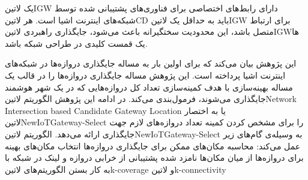 یک ‌لاتین{IGW} دارای رابط‌های اختصاصی برای فناوری‌های پشتیبانی شده توسط شبکه‌های اینترنت اشیا است.
هر ‌لاتین{CD} باید به حداقل یک ‌لاتین{IGW} برای ارتباط متصل باشد، این محدودیت سختگیرانه باعث می‌شود، جایگذاری راهبردی ‌لاتین{IGW}ها یک قمست کلیدی
در طراحی شبکه باشد.

این پژوهش بیان می‌کند که برای اولین بار به مساله جایگذاری دروازه‌ها در شبکه‌های اینترنت اشیا پرداخته است.
این پژوهش مساله جایگذاری دروازه‌ها را در قالب یک مساله بهینه‌سازی با هدف کمینه‌سازی تعداد کل دروازه‌هایی که در یک شهر هوشمند
جایگذاری می‌شوند، فرمول‌بندی می‌کند.
در ادامه این پژوهش الگوریتم ‌لاتین{Network Intersection based Candidate Gateway Location}
یا به اختصار ‌لاتین{NewIoTGateway-Select} را برای مشخص کردن کمینه تعداد دروازه‌های لازم جهت جایگذاری ارائه می‌دهد.
الگوریتم ‌لاتین{NewIoTGateway-Select} به وسیله‌ی گام‌های زیر عمل می‌کند:
 محاسبه مکان‌های ممکن برای جایگذاری دروازه‌ها
 انتخاب مکان‌های بهینه برای دروازه‌ها از میان مکان‌ها نامزد شده
 پشتیبانی از خرابی دروازه و لینک در شبکه با به کار بستن الگوریتم‌های ‌لاتین{k-coverage} و ‌لاتین{k-connectivity}

